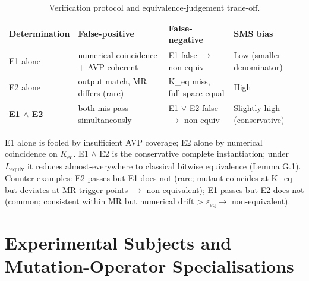 \documentclass[manuscript,screen,review]{acmart}
\begin{document}
{%
\begin{longtable}[]{@{}
  >{\raggedright\arraybackslash}p{}
  >{\raggedright\arraybackslash}p{}
  >{\raggedright\arraybackslash}p{}
  >{\raggedright\arraybackslash}p{}@{}}
\caption{Verification protocol and equivalence-judgement trade-off.}\label{tab:p2-16}\\
\toprule\noalign{}
\begin{minipage}[b]{\linewidth}\raggedright
Determination
\end{minipage} & \begin{minipage}[b]{\linewidth}\raggedright
False-positive
\end{minipage} & \begin{minipage}[b]{\linewidth}\raggedright
False-negative
\end{minipage} & \begin{minipage}[b]{\linewidth}\raggedright
SMS bias
\end{minipage} \\
\midrule\noalign{}
\endfirsthead
\endhead
\bottomrule\noalign{}
\endlastfoot
E1 alone & numerical coincidence + AVP-coherent & E1 false $\to$ non-equiv &
Low (smaller denominator) \\
E2 alone & output match, MR differs (rare) & K\_eq miss, full-space
equal & High \\
\textbf{E1 $\wedge$ E2} & both mis-pass simultaneously & E1 $\vee$ E2 false $\to$ non-equiv
& Slightly high (conservative) \\
\end{longtable}
}

E1 alone is fooled by insufficient AVP coverage; E2 alone by numerical
coincidence on $K_{\mathrm{eq}}$. E1 $\wedge$ E2 is the conservative complete
instantiation; under $L_{\mathrm{equiv}}$ it reduces almost-everywhere to
classical bitwise equivalence (Lemma G.1). Counter-examples: E2 passes
but E1 does not (rare; mutant coincides at K\_eq but deviates at MR
trigger points $\to$ non-equivalent); E1 passes but E2 does not (common;
consistent within MR but numerical drift \textgreater{} $\varepsilon_{\mathrm{eq}} \to$
non-equivalent).


\section{Experimental Subjects and Mutation-Operator Specialisations}\label{b.-experimental-subjects-and-mutation-operator-specialisations}
\end{document}
